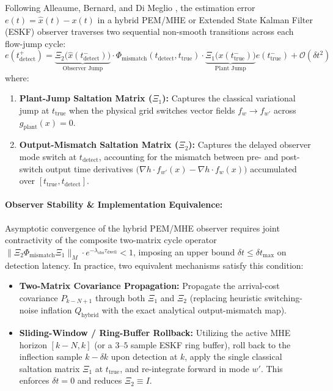 \documentclass[11pt]{article}
\begin{document}
Following Alleaume, Bernard, and Di Meglio \cite{Alleaume2024}, the estimation error $e(t) = \hat{x}(t) - x(t)$ in a hybrid PEM/MHE or Extended State Kalman Filter (ESKF) observer traverses two sequential non-smooth transitions across each flow-jump cycle:
\begin{equation}
e(t_{\mathrm{detect}}^{+}) = \underbrace{\Xi_2\big(\hat{x}(t_{\mathrm{detect}}^{-})\big)}_{\text{Observer Jump}} \cdot \Phi_{\mathrm{mismatch}}(t_{\mathrm{detect}}, t_{\mathrm{true}}) \cdot \underbrace{\Xi_1\big(x(t_{\mathrm{true}}^{-})\big)}_{\text{Plant Jump}} e(t_{\mathrm{true}}^{-}) + \mathcal{O}(\delta t^2)
\end{equation}
where:
\begin{enumerate}
    \item \textbf{Plant-Jump Saltation Matrix ($\Xi_1$):} Captures the classical variational jump at $t_{\mathrm{true}}$ when the physical grid switches vector fields $f_w \to f_{w'}$ across $g_{\mathrm{plant}}(x) = 0$.
    \item \textbf{Output-Mismatch Saltation Matrix ($\Xi_2$):} Captures the delayed observer mode switch at $t_{\mathrm{detect}}$, accounting for the mismatch between pre- and post-switch output time derivatives $\big(\nabla h \cdot f_{w'}(x) - \nabla h \cdot f_w(x)\big)$ accumulated over $[t_{\mathrm{true}}, t_{\mathrm{detect}}]$.
\end{enumerate}

\paragraph{Observer Stability \& Implementation Equivalence:}
Asymptotic convergence of the hybrid PEM/MHE observer requires joint contractivity of the composite two-matrix cycle operator $\|\Xi_2 \Phi_{\mathrm{mismatch}} \Xi_1\|_{M} \cdot e^{-\lambda_{\mathrm{obs}} \tau_{\mathrm{dwell}}} < 1$, imposing an upper bound $\delta t \le \delta t_{\max}$ on detection latency. In practice, two equivalent mechanisms satisfy this condition:
\begin{itemize}
    \item \textbf{Two-Matrix Covariance Propagation:} Propagate the arrival-cost covariance $P_{k-N+1}$ through both $\Xi_1$ and $\Xi_2$ (replacing heuristic switching-noise inflation $Q_{\mathrm{hybrid}}$ with the exact analytical output-mismatch map).
    \item \textbf{Sliding-Window / Ring-Buffer Rollback:} Utilizing the active MHE horizon $[k-N, k]$ (or a $3$--$5$ sample ESKF ring buffer), roll back to the inflection sample $k - \delta k$ upon detection at $k$, apply the single classical saltation matrix $\Xi_1$ at $t_{\mathrm{true}}$, and re-integrate forward in mode $w'$. This enforces $\delta t = 0$ and reduces $\Xi_2 \equiv I$.
\end{itemize}
\end{document}
